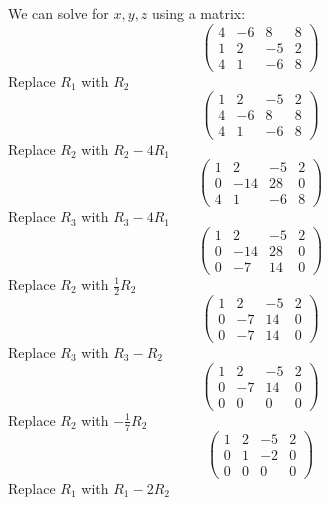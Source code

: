 \documentclass{article}
\begin{document}
\begin{homeworkProblem}
    \solution
    We can solve for $x, y, z$ using a matrix:
    $$\begin{pmatrix}
            4 & -6 & 8  & 8 \\
            1 & 2  & -5 & 2 \\
            4 & 1  & -6 & 8
        \end{pmatrix}$$
    Replace $R_1$ with $R_2$
    $$\begin{pmatrix}
            1 & 2  & -5 & 2 \\
            4 & -6 & 8  & 8 \\
            4 & 1  & -6 & 8
        \end{pmatrix}$$
    Replace $R_2$ with $R_2 - 4R_1$
    $$\begin{pmatrix}
            1 & 2   & -5 & 2 \\
            0 & -14 & 28 & 0 \\
            4 & 1   & -6 & 8
        \end{pmatrix}$$
    Replace $R_3$ with $R_3 - 4R_1$
    $$\begin{pmatrix}
            1 & 2   & -5 & 2 \\
            0 & -14 & 28 & 0 \\
            0 & -7  & 14 & 0
        \end{pmatrix}$$
    Replace $R_2$ with $\frac{1}{2}R_2$
    $$\begin{pmatrix}
            1 & 2  & -5 & 2 \\
            0 & -7 & 14 & 0 \\
            0 & -7 & 14 & 0
        \end{pmatrix}$$
    Replace $R_3$ with $R_3 - R_2$
    $$\begin{pmatrix}
            1 & 2  & -5 & 2 \\
            0 & -7 & 14 & 0 \\
            0 & 0  & 0  & 0
        \end{pmatrix}$$
    Replace $R_2$ with $-\frac{1}{7}R_2$
    $$\begin{pmatrix}
            1 & 2 & -5 & 2 \\
            0 & 1 & -2 & 0 \\
            0 & 0 & 0  & 0
        \end{pmatrix}$$
    Replace $R_1$ with $R_1 - 2R_2$

\end{homeworkProblem}
\end{document}
